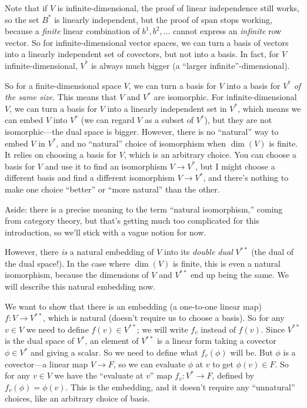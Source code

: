 \documentclass{article}
\begin{document}
Note that if $V$ is infinite-dimensional, the proof of linear independence still works, so the set $B^*$ is linearly independent, but the proof of span stops working, because a \textit{finite} linear combination of $b^1,b^2,\hdots$ cannot express an \textit{infinite} row vector. So for infinite-dimensional vector spaces, we can turn a basis of vectors into a linearly independent set of covectors, but not into a basis. In fact, for $V$ infinite-dimensional, $V^*$ is always much bigger (a ``larger infinite''-dimensional).

So for a finite-dimensional space $V$, we can turn a basis for $V$ into a basis for $V^*$ \textit{of the same size}. This means that $V$ and $V^*$ are isomorphic. For infinite-dimensional $V$, we can turn a basis for $V$ into a linearly independent set in $V^*$, which means we can embed $V$ into $V^*$ (we can regard $V$ as a subset of $V^*$), but they are not isomorphic---the dual space is bigger. However, there is no ``natural'' way to embed $V$ in $V^*$, and no ``natural'' choice of isomorphism when $\dim(V)$ is finite. It relies on choosing a basis for $V$, which is an arbitrary choice. You can choose a basis for $V$ and use it to find an isomorphism $V\to V^*$, but I might choose a different basis and find a different isomorphism $V\to V^*$, and there's nothing to make one choice ``better'' or ``more natural'' than the other.

Aside: there is a precise meaning to the term ``natural isomorphism,'' coming from category theory, but that's getting much too complicated for this introduction, so we'll stick with a vague notion for now.

However, there \textit{is} a natural embedding of $V$ into its \textit{double dual} $V^{**}$ (the dual of the dual space!). In the case where $\dim(V)$ is finite, this is even a natural isomorphism, because the dimensions of $V$ and $V^{**}$ end up being the same. We will describe this natural embedding now.

We want to show that there is an embedding (a one-to-one linear map) $f:V\to V^{**}$, which is natural (doesn't require us to choose a basis). So for any $v\in V$ we need to define $f(v)\in V^{**}$; we will write $f_v$ instead of $f(v)$. Since $V^{**}$ is the dual space of $V^*$, an element of $V^{**}$ is a linear form taking a covector $\phi\in V^*$ and giving a scalar. So we need to define what $f_v(\phi)$ will be. But $\phi$ is a covector---a linear map $V\to F$, so we can evaluate $\phi$ at $v$ to get $\phi(v)\in F$. So for any $v\in V$ we have the ``evaluate at $v$'' map $f_v:V^*\to F$, defined by $f_v(\phi)=\phi(v)$. This is the embedding, and it doesn't require any ``unnatural'' choices, like an arbitrary choice of basis.\medskip
\end{document}
